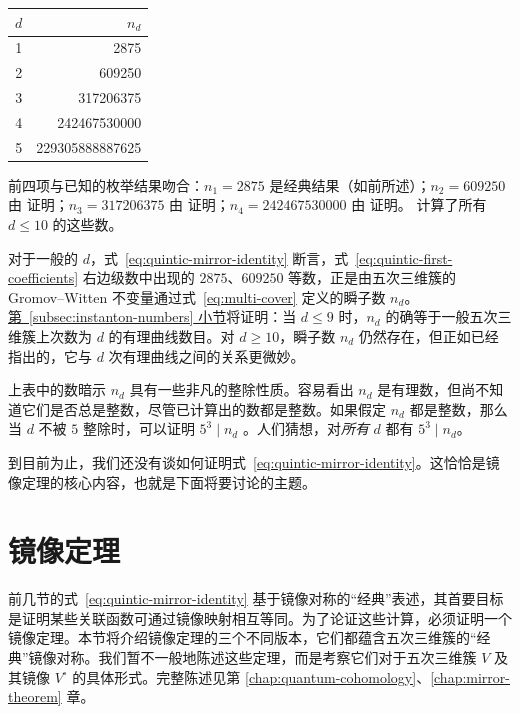 \begin{center}
\begin{tabular}{r|r}
$d$ & $n_d$\\\hline
1 & 2875\\
2 & 609250\\
3 & 317206375\\
4 & 242467530000\\
5 & 229305888887625
\end{tabular}
\end{center}
前四项与已知的枚举结果吻合：$n_1=2875$ 是经典结果（如前所述）；$n_2=609250$ 由  证明；$n_3=317206375$ 由  证明；$n_4=242467530000$ 由  证明。 计算了所有 $d\leq10$ 的这些数。

对于一般的 $d$，式~\eqref{eq:quintic-mirror-identity} 断言，式~\eqref{eq:quintic-first-coefficients} 右边级数中出现的 $2875$、$609250$ 等数，正是由五次三维簇的 Gromov--Witten 不变量通过式~\eqref{eq:multi-cover} 定义的瞬子数 $n_d$。\hyperref[subsec:instanton-numbers]{第~\ref*{subsec:instanton-numbers} 小节}将证明：当 $d\leq9$ 时，$n_d$ 的确等于一般五次三维簇上次数为 $d$ 的有理曲线数目。对 $d\geq10$，瞬子数 $n_d$ 仍然存在，但正如已经指出的，它与 $d$ 次有理曲线之间的关系更微妙。

上表中的数暗示 $n_d$ 具有一些非凡的整除性质。容易看出 $n_d$ 是有理数，但尚不知道它们是否总是整数，尽管已计算出的数都是整数。如果假定 $n_d$ 都是整数，那么当 $d$ 不被 $5$ 整除时，可以证明 $5^3\mid n_d$ 。人们猜想，对\emph{所有} $d$ 都有 $5^3\mid n_d$。

到目前为止，我们还没有谈如何证明式~\eqref{eq:quintic-mirror-identity}。这恰恰是镜像定理的核心内容，也就是下面将要讨论的主题。

\begingroup\linespread{1.22}\selectfont
\section{镜像定理}\label{sec:quintic-other-methods}

前几节的式~\eqref{eq:quintic-mirror-identity} 基于镜像对称的“经典”表述，其首要目标是证明某些关联函数可通过镜像映射相互等同。为了论证这些计算，必须证明一个镜像定理。本节将介绍镜像定理的三个不同版本，它们都蕴含五次三维簇的“经典”镜像对称。我们暂不一般地陈述这些定理，而是考察它们对于五次三维簇 $V$ 及其镜像 $V^\circ$ 的具体形式。完整陈述见第 \hyperref[chap:quantum-cohomology]{\ref*{chap:quantum-cohomology}}、\hyperref[chap:mirror-theorem]{\ref*{chap:mirror-theorem}} 章。

